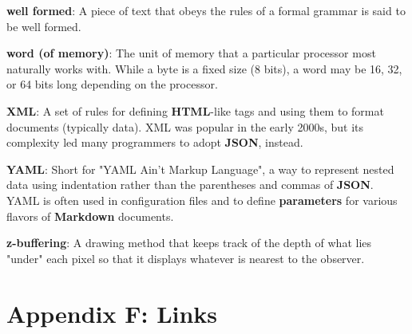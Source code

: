\documentclass[krantzl]{krantz}
\newcommand{\glosskey}[1]{\textbf{#1}}
\begin{document}
\noindent \textbf{\glosskey{well formed}}: 
A piece of text that obeys the rules of a formal grammar is said to be well formed.


\noindent \textbf{\glosskey{word (of memory)}}: 
The unit of memory that a particular processor most naturally works with. While a byte is a fixed size (8 bits), a word may be 16, 32, or 64 bits long depending on the processor.


\noindent \textbf{\glosskey{XML}}: 
A set of rules for defining \glosskey{HTML}-like tags and using them to format documents (typically data). XML was popular in the early 2000s, but its complexity led many programmers to adopt \glosskey{JSON}, instead.


\noindent \textbf{\glosskey{YAML}}: 
Short for "YAML Ain't Markup Language", a way to represent nested data using indentation rather than the parentheses and commas of \glosskey{JSON}. YAML is often used in configuration files and to define \glosskey{parameters} for various flavors of \glosskey{Markdown} documents.


\noindent \textbf{\glosskey{z-buffering}}: 
A drawing method that keeps track of the depth of what lies "under" each pixel so that it displays whatever is nearest to the observer.




\chapter{Appendix F: Links}\label{links}
\end{document}
